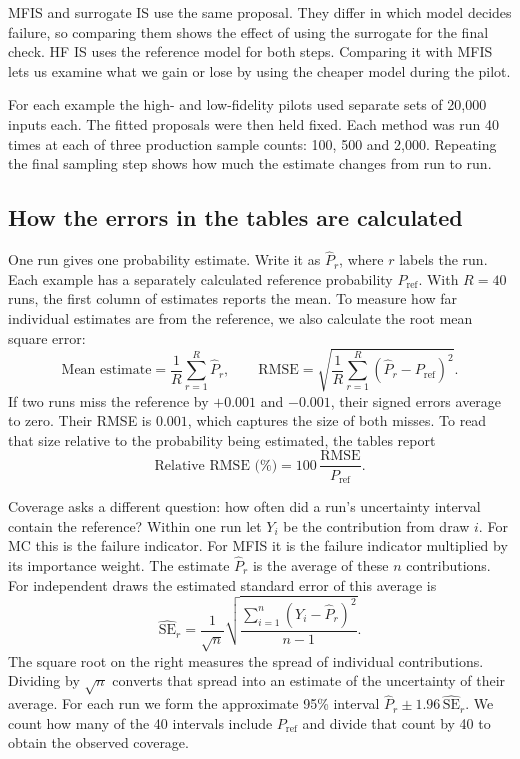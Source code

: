 \documentclass[11pt,a4paper]{article}
\begin{document}
MFIS and surrogate IS use the same proposal. They differ in which model decides failure, so comparing them shows the effect of using the surrogate for the final check. HF IS uses the reference model for both steps. Comparing it with MFIS lets us examine what we gain or lose by using the cheaper model during the pilot.

For each example the high- and low-fidelity pilots used separate sets of 20,000 inputs each. The fitted proposals were then held fixed. Each method was run 40 times at each of three production sample counts: 100, 500 and 2,000. Repeating the final sampling step shows how much the estimate changes from run to run.

\subsection{How the errors in the tables are calculated}
One run gives one probability estimate. Write it as $\widehat P_r$, where $r$ labels the run. Each example has a separately calculated reference probability $P_{\mathrm{ref}}$. With $R=40$ runs, the first column of estimates reports the mean. To measure how far individual estimates are from the reference, we also calculate the root mean square error:
\begin{equation}
\text{Mean estimate}=\frac{1}{R}\sum_{r=1}^R\widehat P_r,\qquad
\mathrm{RMSE}=\sqrt{\frac{1}{R}\sum_{r=1}^R(\widehat P_r-P_{\mathrm{ref}})^2}.
\end{equation}
If two runs miss the reference by $+0.001$ and $-0.001$, their signed errors average to zero. Their RMSE is $0.001$, which captures the size of both misses. To read that size relative to the probability being estimated, the tables report
\[
\text{Relative RMSE (\%)}=100\,\frac{\mathrm{RMSE}}{P_{\mathrm{ref}}}.
\]

Coverage asks a different question: how often did a run's uncertainty interval contain the reference? Within one run let $Y_i$ be the contribution from draw $i$. For MC this is the failure indicator. For MFIS it is the failure indicator multiplied by its importance weight. The estimate $\widehat P_r$ is the average of these $n$ contributions. For independent draws the estimated standard error of this average is
\[
\widehat{\mathrm{SE}}_r
=\frac{1}{\sqrt n}
 \sqrt{\frac{\sum_{i=1}^n(Y_i-\widehat P_r)^2}{n-1}} .
\]
The square root on the right measures the spread of individual contributions. Dividing by $\sqrt n$ converts that spread into an estimate of the uncertainty of their average. For each run we form the approximate 95\% interval $\widehat P_r\pm1.96\,\widehat{\mathrm{SE}}_r$. We count how many of the 40 intervals include $P_{\mathrm{ref}}$ and divide that count by 40 to obtain the observed coverage.
\end{document}
